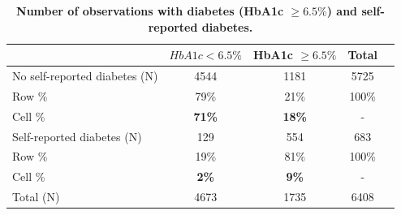 \documentclass[12pt,english]{article}
\begin{document}
\clearpage

\begin{table}[!ht]
	\caption{\label{tab:Biomarker_observations}{\bf Number of observations with diabetes (HbA1c $\geq 6.5\%$) and self-reported diabetes.}}
	\begin{center}
		\begin{adjustbox}{max width=\linewidth}
			\begin{threeparttable}
				{
					\def\sym#1{\ifmmode^{#1}\else\(^{#1}\)\fi}
					\begin{tabular}{lcccc}
						\toprule
						&\multicolumn{1}{c}{$HbA1c < 6.5\%$}&\multicolumn{1}{c}{HbA1c $\geq 6.5\%$}&\multicolumn{1}{c}{Total}\\
						\midrule
						No self-reported diabetes (N) & 4544 & 1181 & 5725 &  \\
						\hspace*{10mm}Row  \% & 79\% & 21\% & 100\% &  \\
						\hspace*{10mm}Cell \% & \textbf{71\%} & \textbf{18\%} & - & \\
						Self-reported diabetes (N) & 129 & 554 & 683 &  \\
						\hspace*{10mm}Row \%  & 19\% & 81\% & 100\% &  \\
						\hspace*{10mm}Cell \% & \textbf{2\%} &\textbf{9\%} &- & \\
						Total (N) & 4673 & 1735 & 6408 &  \\ 
						\bottomrule
					\end{tabular}
					\begin{tablenotes}
						\item
					\end{tablenotes}
				}
			\end{threeparttable}
		\end{adjustbox}
	\end{center}
\end{table}


\clearpage
\end{document}

